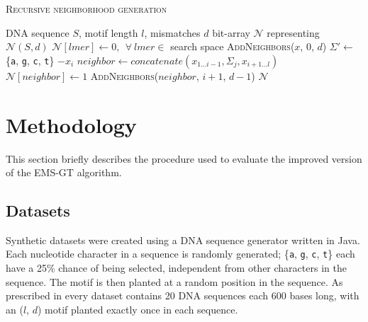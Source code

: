 \documentclass[oneside,12pt]{DISCSthesis}
\begin{document}
{		{
			\noindent \hspace*{6pt}{\bf Algorithm 2.3} \textsc{Recursive neighborhood generation}\small
			\begin{algorithmic}[1]
				\label{alg:recursive-nbr-gen}
				\Require DNA sequence $S$, motif length $l$, mismatches $d$
				\Ensure bit-array $\mathcal{N}$ representing $\mathcal{N}(S,d)$ \vspace*{6pt}
				\State $\mathcal{N}[lmer] \leftarrow 0,\ \ \forall\ lmer \in $ search space 
				\State \textsc{AddNeighbors}($x$, 0, $d$) \hspace*{79pt}
				\EndFor
				\newline
				\State {}
						\State $\Sigma' \leftarrow$ \{\texttt{a}, \texttt{g}, \texttt{c}, \texttt{t}\} $- x_{i}$ \hspace*{79pt}
							\State $neighbor \leftarrow concatenate(x_{1...i-1},\Sigma_{j},x_{i+1...l})$
							\State $\mathcal{N}[neighbor] \leftarrow 1$
								\State \textsc{AddNeighbors}($neighbor$, $i+1$, $d-1$)
							\EndIf
						\EndFor
					\EndFor
				\EndProcedure
				\State\Return $\mathcal{N}$
				\end{algorithmic}
			}

\chapter{Methodology}
	This section briefly describes the procedure used to evaluate the improved version of the EMS-GT algorithm.

	\section{Datasets}
		Synthetic datasets were created using a DNA sequence generator written in Java. Each nucleotide character in a sequence is randomly generated; \{\texttt{a}, \texttt{g}, \texttt{c}, \texttt{t}\} each have a 25\% chance of being selected, independent from other characters in the sequence.
		The motif is then planted at a random position in the sequence. As prescribed in \cite{pevzner2000combinatorial} every dataset contains 20 DNA sequences each 600 bases long, with an ($l$, $d$) motif planted exactly once in each sequence.

}
\end{document}
